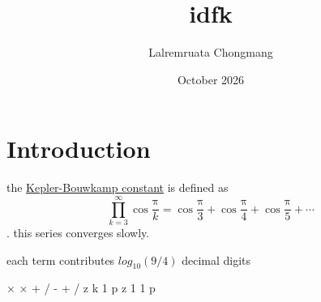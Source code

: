 \documentclass{article}
\title{idfk}
\author{Lalremruata Chongmang}
\date{October 2026}
\begin{document}
\maketitle

\section{Introduction}

the \href{https://en.wikipedia.org/wiki/Kepler%E2%80%93Bouwkamp_constant}{Kepler-Bouwkamp constant} is defined as $$\prod_{k=3}^{\infty} \cos \dfrac{\mathrm \pi}{k} = \cos \dfrac{\mathrm \pi}{3} + \cos \dfrac{\mathrm \pi}{4} + \cos\dfrac{\mathrm \pi}{5} + \cdots$$. this series converges slowly.

each term contributes $log_{10}(9/4)$ decimal digits

× × + / - + / z k 1 p z 1 1 p
\end{document}
